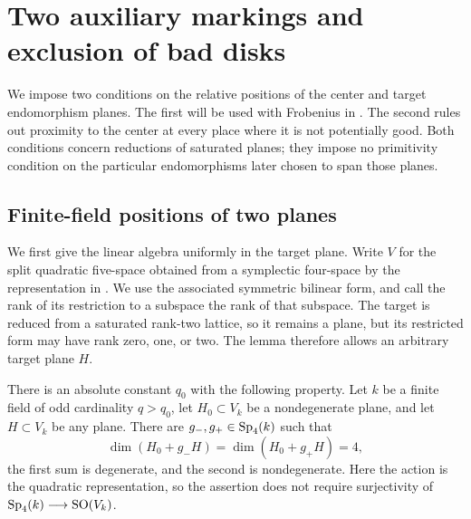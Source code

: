 \section{Two auxiliary markings and exclusion of bad disks}\label{inc:section}

We impose two conditions on the relative positions of the center and target
endomorphism planes.  The first will be used with Frobenius in
.  The second rules out proximity to the center at
every place where it is not potentially good.  Both conditions concern
reductions of saturated planes; they impose no primitivity condition on
the particular endomorphisms later chosen to span those planes.

\subsection{Finite-field positions of two planes}

We first give the linear algebra uniformly in the target plane.  Write
$V$ for the split quadratic five-space obtained from a symplectic
four-space by the representation in .  We use the
associated symmetric bilinear form, and call the rank of its restriction
to a subspace the rank of that subspace.
The target is reduced from a saturated rank-two lattice, so it remains
a plane, but its restricted form may have rank zero, one, or two.
The lemma therefore allows an arbitrary target plane $H$.

\begin{lemma}\label{inc:finite-fields}
There is an absolute constant $q_0$ with the following property.  Let
$k$ be a finite field of odd cardinality $q>q_0$, let $H_0\subset V_k$
be a nondegenerate plane, and let $H\subset V_k$ be any plane.  There
are $g_-,g_+\in\operatorname{Sp}_4(k)$ such that
\[
 \dim(H_0+g_-H)=\dim(H_0+g_+H)=4,
\]
the first sum is degenerate, and the second is nondegenerate.
Here the action is the quadratic representation, so the assertion
does not require surjectivity of $\operatorname{Sp}_4(k)\longrightarrow\operatorname{SO}(V_k)$.
\end{lemma}

